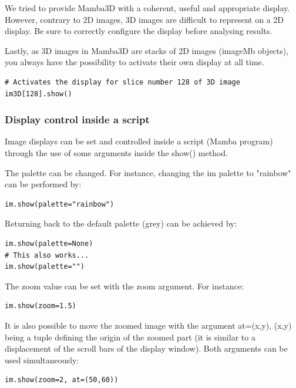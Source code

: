 \documentclass[a4paper,10pt,oneside]{article}
\begin{document}
We tried to provide Mamba3D with a coherent, useful and appropriate display.
However, contrary to 2D images, 3D images are difficult to represent on a 2D
display. Be sure to correctly configure the display before analysing results.

Lastly, as 3D images in Mamba3D are stacks of 2D images (imageMb objects), you 
always have the possibility to activate their own display at all time.

\lstset{language=Python}
\begin{lstlisting}
# Activates the display for slice number 128 of 3D image
im3D[128].show()
\end{lstlisting}

\subsubsection{Display control inside a script}
\label{cha:dis_arguments}

Image displays can be set and controlled inside a script (Mamba program) through the use
of some arguments inside the show() method.

The palette can be changed. For instance, changing the im palette to "rainbow"
can be performed by:

\lstset{language=Python}
\begin{lstlisting}
im.show(palette="rainbow")
\end{lstlisting}

Returning back to the default palette (grey) can be achieved by:

\lstset{language=Python}
\begin{lstlisting}
im.show(palette=None)
# This also works...
im.show(palette="")
\end{lstlisting}

The zoom value can be set with the zoom argument. For instance:

\lstset{language=Python}
\begin{lstlisting}
im.show(zoom=1.5)
\end{lstlisting}

It is also possible to move the zoomed image with the argument at=(x,y), (x,y) being
a tuple defining the origin of the zoomed part (it is similar to a displacement of the
scroll bars of the display window). Both arguments can be used simultaneously:

\lstset{language=Python}
\begin{lstlisting}
im.show(zoom=2, at=(50,60))
\end{lstlisting}
\end{document}
